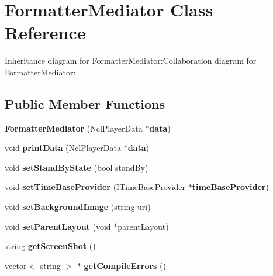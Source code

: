 \section{FormatterMediator Class Reference}
\label{classbr_1_1pucrio_1_1telemidia_1_1ginga_1_1ncl_1_1FormatterMediator}
Inheritance diagram for FormatterMediator:Collaboration diagram for FormatterMediator:\subsection*{Public Member Functions}
\begin{CompactItemize}
\item 
\textbf{FormatterMediator} (NclPlayerData $\ast${\bf data})\label{classbr_1_1pucrio_1_1telemidia_1_1ginga_1_1ncl_1_1FormatterMediator_cdb29b4aa6c52399ed9fb27433437f55}

\item 
void \textbf{printData} (NclPlayerData $\ast${\bf data})\label{classbr_1_1pucrio_1_1telemidia_1_1ginga_1_1ncl_1_1FormatterMediator_5c0cb98256ed3d719c540faac12806b8}

\item 
void \textbf{setStandByState} (bool standBy)\label{classbr_1_1pucrio_1_1telemidia_1_1ginga_1_1ncl_1_1FormatterMediator_ec91d5450ec8c5bd48870cb2e1f5596f}

\item 
void \textbf{setTimeBaseProvider} (ITimeBaseProvider $\ast${\bf timeBaseProvider})\label{classbr_1_1pucrio_1_1telemidia_1_1ginga_1_1ncl_1_1FormatterMediator_5a671c0102c7b736e7e0e78e50f9922c}

\item 
void \textbf{setBackgroundImage} (string uri)\label{classbr_1_1pucrio_1_1telemidia_1_1ginga_1_1ncl_1_1FormatterMediator_795fc8fc43213cc9edc9b8fc6205643d}

\item 
void \textbf{setParentLayout} (void $\ast$parentLayout)\label{classbr_1_1pucrio_1_1telemidia_1_1ginga_1_1ncl_1_1FormatterMediator_74c670802f7db3f51ac0a3649643540d}

\item 
string \textbf{getScreenShot} ()\label{classbr_1_1pucrio_1_1telemidia_1_1ginga_1_1ncl_1_1FormatterMediator_c3bbd2029ed65635a16b2bd0c868c7f3}

\item 
vector$<$ string $>$ $\ast$ \textbf{getCompileErrors} ()\label{classbr_1_1pucrio_1_1telemidia_1_1ginga_1_1ncl_1_1FormatterMediator_acb3e68db4bd7dbd9fe7984614a70743}


\end{CompactItemize}
